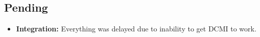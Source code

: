 \subsection{Pending}

\begin{itemize}
	\item \textbf{Integration:} Everything was delayed due to inability to get DCMI to work.
\end{itemize}

